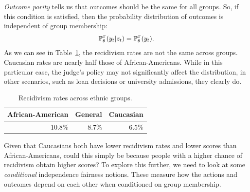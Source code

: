 \begin{frame}
{      
      \emph{Outcome parity} tells us that outcomes should be the same
      for all groups. So, if this condition is satisfied, then the
      probability distribution of outcomes is independent of group
      membership:
      \begin{equation}
        \label{eq:eqality-outcomes}
        \mathop{\mbox{\ensuremath{\mathbb{P}}}}\nolimits_\theta^\pi(y_t | z_t) =       \mathop{\mbox{\ensuremath{\mathbb{P}}}}\nolimits_\theta^\pi(y_t ).
      \end{equation}
      As we can see in Table~\ref{tab:recidivism}, the recidivism rates are not the same across groups. Caucasian rates are nearly half those of African-Americans. While in this particular case, the judge's policy may not significantly affect the distribution, in other scenarios, such as loan decisions or university admissions, they clearly do. 
      \begin{table}[h]
        \centering
        \begin{tabular}{r|r|r}
          African-American& General & Caucasian\\
          \hline
          10.8\% & 8.7\% & 6.5\% 
        \end{tabular}
        \caption{Recidivism rates across ethnic groups.}
        \label{tab:recidivism}
      \end{table}
      Given that Caucasians both have lower recidivism rates and lower scores than African-Americans, could this simply be because people with a higher chance of recidivism obtain higher scores? To explore this further, we need to look at some \emph{conditional} independence fairness notions. These measure how the actions and outcomes depend on each other when conditioned on group membership.
    }
  \end{frame}

